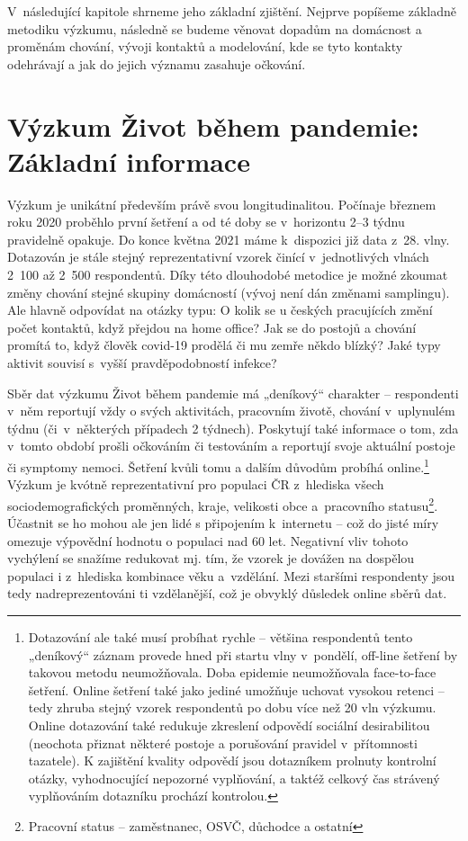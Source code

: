 V následující kapitole shrneme jeho základní zjištění. Nejprve popíšeme základně metodiku výzkumu, následně se budeme věnovat dopadům na domácnost a proměnám chování, vývoji kontaktů a modelování, kde se tyto kontakty odehrávají a jak do jejich významu zasahuje očkování.

\section*{Výzkum Život během pandemie: Základní informace}

Výzkum je unikátní především právě svou longitudinalitou. Počínaje březnem roku 2020 proběhlo první šetření a od té doby se v horizontu 2–3 týdnu pravidelně opakuje. Do konce května 2021 máme k dispozici již data z 28. vlny. Dotazován je stále stejný reprezentativní vzorek činící v jednotlivých vlnách 2 100 až 2 500 respondentů. Díky této dlouhodobé metodice je možné zkoumat změny chování stejné skupiny domácností (vývoj není dán změnami samplingu). Ale hlavně odpovídat na otázky typu: O kolik se u českých pracujících změní počet kontaktů, když přejdou na home office? Jak se do postojů a chování promítá to, když člověk covid-19 prodělá či mu zemře někdo blízký? Jaké typy aktivit souvisí s vyšší pravděpodobností infekce?

Sběr dat výzkumu Život během pandemie má „deníkový“ charakter – respondenti v něm reportují vždy o svých aktivitách, pracovním životě, chování v uplynulém týdnu (či v některých případech 2 týdnech). Poskytují také informace o tom, zda v tomto období prošli očkováním či testováním a reportují svoje aktuální postoje či symptomy nemoci. Šetření kvůli tomu a dalším důvodům probíhá online.\footnote{Dotazování ale také musí probíhat rychle – většina respondentů tento „deníkový“ záznam provede hned při startu vlny v pondělí, off-line šetření by takovou metodu neumožňovala. Doba epidemie neumožňovala face-to-face šetření. Online šetření také jako jediné umožňuje uchovat vysokou retenci – tedy zhruba stejný vzorek respondentů po dobu více než 20 vln výzkumu. Online dotazování také redukuje zkreslení odpovědí sociální desirabilitou (neochota přiznat některé postoje a porušování pravidel v přítomnosti tazatele). K zajištění kvality odpovědí jsou dotazníkem prolnuty kontrolní otázky, vyhodnocující nepozorné vyplňování, a taktéž celkový čas strávený vyplňováním dotazníku prochází kontrolou. } Výzkum je kvótně reprezentativní pro populaci ČR z hlediska všech sociodemografických proměnných, kraje, velikosti obce a pracovního statusu\footnote{Pracovní status – zaměstnanec, OSVČ, důchodce a ostatní}. Účastnit se ho mohou ale jen lidé s připojením k internetu – což do jisté míry omezuje výpovědní hodnotu o populaci nad 60 let. Negativní vliv tohoto vychýlení se snažíme redukovat mj. tím, že vzorek je dovážen na dospělou populaci i z hlediska kombinace věku a vzdělání. Mezi staršími respondenty jsou tedy nadreprezentováni ti vzdělanější, což je obvyklý důsledek online sběrů dat.

